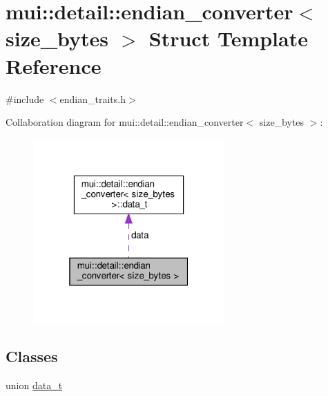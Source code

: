 \hypertarget{structmui_1_1detail_1_1endian__converter}{}\section{mui\+:\+:detail\+:\+:endian\+\_\+converter$<$ size\+\_\+bytes $>$ Struct Template Reference}
\label{structmui_1_1detail_1_1endian__converter}


{\ttfamily \#include $<$endian\+\_\+traits.\+h$>$}



Collaboration diagram for mui\+:\+:detail\+:\+:endian\+\_\+converter$<$ size\+\_\+bytes $>$\+:
\nopagebreak
\begin{figure}[H]
\begin{center}
\leavevmode
\includegraphics[width=208pt]{structmui_1_1detail_1_1endian__converter__coll__graph}
\end{center}
\end{figure}
\subsection*{Classes}
\begin{DoxyCompactItemize}
\item 
union \hyperlink{unionmui_1_1detail_1_1endian__converter_1_1data__t}{data\+\_\+t}
\end{DoxyCompactItemize}
